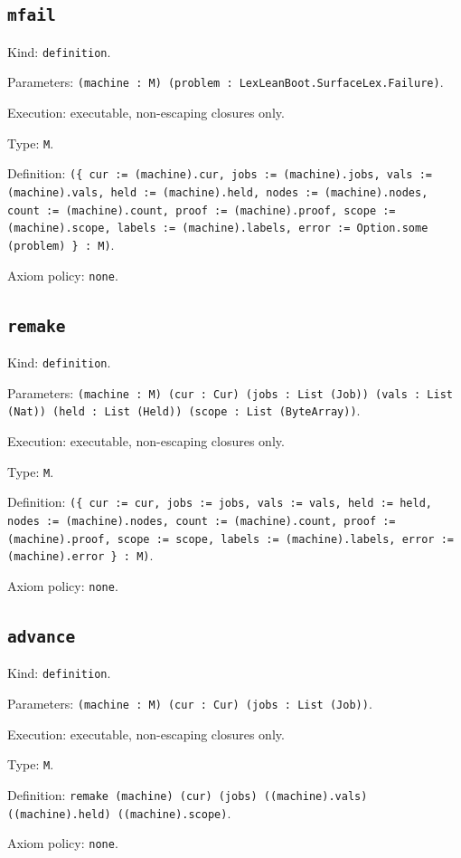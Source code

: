 \documentclass[11pt]{article}
\begin{document}
\subsection*{\texttt{mfail}}
\noindent Kind: \texttt{definition}.\par
\noindent Parameters: \texttt{(machine : M) (problem : LexLeanBoot.SurfaceLex.Failure)}.\par
\noindent Execution: executable, non-escaping closures only.\par
\noindent Type: \texttt{M}.\par
\noindent Definition: \texttt{(\{ cur := (machine).cur, jobs := (machine).jobs, vals := (machine).vals, held := (machine).held, nodes := (machine).nodes, count := (machine).count, proof := (machine).proof, scope := (machine).scope, labels := (machine).labels, error := Option.some (problem) \} : M)}.\par
\noindent Axiom policy: \texttt{none}.\par
\subsection*{\texttt{remake}}
\noindent Kind: \texttt{definition}.\par
\noindent Parameters: \texttt{(machine : M) (cur : Cur) (jobs : List (Job)) (vals : List (Nat)) (held : List (Held)) (scope : List (ByteArray))}.\par
\noindent Execution: executable, non-escaping closures only.\par
\noindent Type: \texttt{M}.\par
\noindent Definition: \texttt{(\{ cur := cur, jobs := jobs, vals := vals, held := held, nodes := (machine).nodes, count := (machine).count, proof := (machine).proof, scope := scope, labels := (machine).labels, error := (machine).error \} : M)}.\par
\noindent Axiom policy: \texttt{none}.\par
\subsection*{\texttt{advance}}
\noindent Kind: \texttt{definition}.\par
\noindent Parameters: \texttt{(machine : M) (cur : Cur) (jobs : List (Job))}.\par
\noindent Execution: executable, non-escaping closures only.\par
\noindent Type: \texttt{M}.\par
\noindent Definition: \texttt{remake (machine) (cur) (jobs) ((machine).vals) ((machine).held) ((machine).scope)}.\par
\noindent Axiom policy: \texttt{none}.\par
\end{document}
